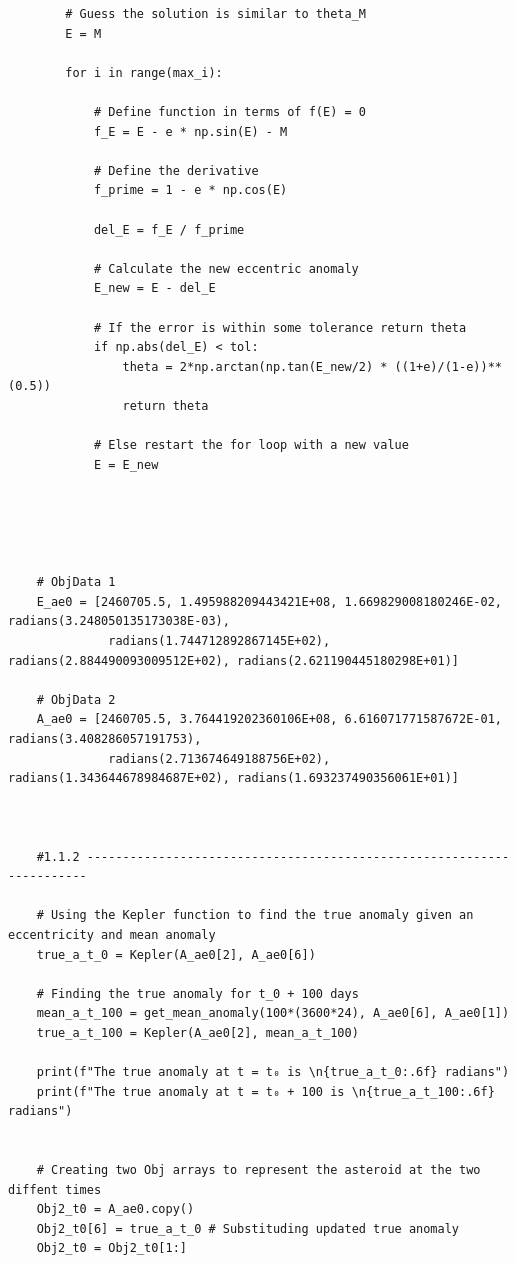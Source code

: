 \documentclass[12pt,twocolumn]{article}  %
\begin{document}
\begin{lstlisting}
        # Guess the solution is similar to theta_M
        E = M
        
        for i in range(max_i):
            
            # Define function in terms of f(E) = 0
            f_E = E - e * np.sin(E) - M
            
            # Define the derivative
            f_prime = 1 - e * np.cos(E)
            
            del_E = f_E / f_prime
            
            # Calculate the new eccentric anomaly
            E_new = E - del_E
            
            # If the error is within some tolerance return theta
            if np.abs(del_E) < tol:
                theta = 2*np.arctan(np.tan(E_new/2) * ((1+e)/(1-e))**(0.5))
                return theta
            
            # Else restart the for loop with a new value
            E = E_new
     
            
    
    
    
    # ObjData 1    
    E_ae0 = [2460705.5, 1.495988209443421E+08, 1.669829008180246E-02, radians(3.248050135173038E-03), 
              radians(1.744712892867145E+02), radians(2.884490093009512E+02), radians(2.621190445180298E+01)]
    
    # ObjData 2
    A_ae0 = [2460705.5, 3.764419202360106E+08, 6.616071771587672E-01, radians(3.408286057191753),
              radians(2.713674649188756E+02), radians(1.343644678984687E+02), radians(1.693237490356061E+01)]
    
    
    
    #1.1.2 ----------------------------------------------------------------------
    
    # Using the Kepler function to find the true anomaly given an eccentricity and mean anomaly
    true_a_t_0 = Kepler(A_ae0[2], A_ae0[6])
    
    # Finding the true anomaly for t_0 + 100 days
    mean_a_t_100 = get_mean_anomaly(100*(3600*24), A_ae0[6], A_ae0[1])
    true_a_t_100 = Kepler(A_ae0[2], mean_a_t_100)
    
    print(f"The true anomaly at t = t₀ is \n{true_a_t_0:.6f} radians")
    print(f"The true anomaly at t = t₀ + 100 is \n{true_a_t_100:.6f} radians")
    
    
    # Creating two Obj arrays to represent the asteroid at the two diffent times 
    Obj2_t0 = A_ae0.copy()
    Obj2_t0[6] = true_a_t_0 # Substituding updated true anomaly
    Obj2_t0 = Obj2_t0[1:]
    

\end{lstlisting}
\end{document}
